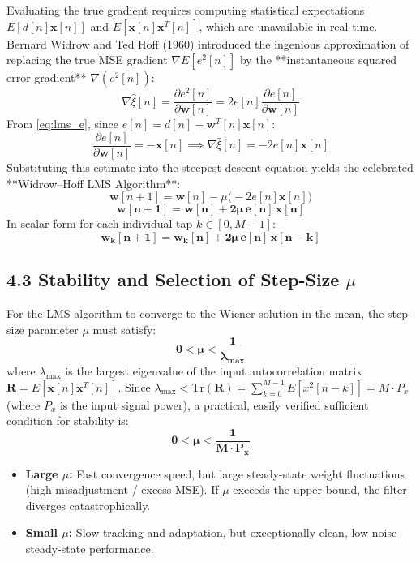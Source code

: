 \documentclass[11pt,a4paper]{article}
\begin{document}
Evaluating the true gradient requires computing statistical expectations $E[d[n]\mathbf{x}[n]]$ and $E[\mathbf{x}[n]\mathbf{x}^T[n]]$, which are unavailable in real time. 
Bernard Widrow and Ted Hoff (1960) introduced the ingenious approximation of replacing the true MSE gradient $\nabla E[e^2[n]]$ by the **instantaneous squared error gradient** $\nabla (e^2[n])$:
\begin{equation}
\nabla \hat{\xi}[n] = \frac{\partial e^2[n]}{\partial \mathbf{w}[n]} = 2 e[n] \frac{\partial e[n]}{\partial \mathbf{w}[n]}
\end{equation}
From \eqref{eq:lms_e}, since $e[n] = d[n] - \mathbf{w}^T[n]\mathbf{x}[n]$:
\begin{equation}
\frac{\partial e[n]}{\partial \mathbf{w}[n]} = -\mathbf{x}[n] \implies \nabla \hat{\xi}[n] = -2 e[n] \mathbf{x}[n]
\end{equation}
Substituting this estimate into the steepest descent equation yields the celebrated **Widrow--Hoff LMS Algorithm**:
\begin{equation}
\mathbf{w}[n+1] = \mathbf{w}[n] - \mu \big( -2 e[n] \mathbf{x}[n] \big)
\end{equation}
\begin{equation}
\mathbf{\mathbf{w}[n+1] = \mathbf{w}[n] + 2\mu \, e[n] \, \mathbf{x}[n]}
\label{eq:lms_update}
\end{equation}
In scalar form for each individual tap $k \in [0, M-1]$:
\begin{equation}
\mathbf{w_k[n+1] = w_k[n] + 2\mu \, e[n] \, x[n-k]}
\end{equation}

\subsection{4.3 Stability and Selection of Step-Size \texorpdfstring{$\mu$}{mu}}
For the LMS algorithm to converge to the Wiener solution in the mean, the step-size parameter $\mu$ must satisfy:
\begin{equation}
\mathbf{0 < \mu < \frac{1}{\lambda_{\max}}}
\end{equation}
where $\lambda_{\max}$ is the largest eigenvalue of the input autocorrelation matrix $\mathbf{R} = E[\mathbf{x}[n]\mathbf{x}^T[n]]$.
Since $\lambda_{\max} < \text{Tr}(\mathbf{R}) = \sum_{k=0}^{M-1} E[x^2[n-k]] = M \cdot P_x$ (where $P_x$ is the input signal power), a practical, easily verified sufficient condition for stability is:
\begin{equation}
\mathbf{0 < \mu < \frac{1}{M \cdot P_x}}
\label{eq:mu_bound}
\end{equation}
\begin{itemize}
    \item \textbf{Large $\mu$:} Fast convergence speed, but large steady-state weight fluctuations (high misadjustment / excess MSE). If $\mu$ exceeds the upper bound, the filter diverges catastrophically.
    \item \textbf{Small $\mu$:} Slow tracking and adaptation, but exceptionally clean, low-noise steady-state performance.
\end{itemize}
\end{document}

